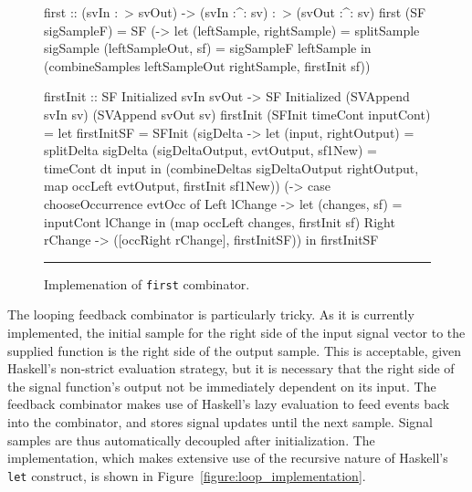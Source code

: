 \begin{figure}
\begin{code}
first :: (svIn :~> svOut) -> (svIn :^: sv) :~> (svOut :^: sv)
first (SF sigSampleF) =
  SF (\sigSample -> let (leftSample, rightSample) = splitSample sigSample
                        (leftSampleOut, sf) = sigSampleF leftSample
                    in (combineSamples leftSampleOut rightSample,
                        firstInit sf))

firstInit ::    SF Initialized svIn svOut
             -> SF Initialized (SVAppend svIn sv) (SVAppend svOut sv)
firstInit (SFInit timeCont inputCont) = 
  let firstInitSF =
    SFInit (\dt sigDelta ->
               let (input, rightOutput) = splitDelta sigDelta
                   (sigDeltaOutput, evtOutput, sf1New) = timeCont dt input
               in (combineDeltas sigDeltaOutput rightOutput,
                   map occLeft evtOutput,
                   firstInit sf1New))
           (\evtOcc ->
              case chooseOccurrence evtOcc of
                Left  lChange -> let (changes, sf) = inputCont lChange
                                 in (map occLeft changes, firstInit sf)
                Right rChange -> ([occRight rChange], firstInitSF))
  in firstInitSF
\end{code}
\hrule
\caption{Implemenation of {\tt first} combinator.}
\label{figure:first_implementation}
\end{figure}

The looping feedback combinator is particularly tricky. As it is currently
implemented, the initial sample for the right side of the input signal vector to
the supplied function is the right side of the output sample. This is acceptable,
given Haskell's non-strict evaluation strategy, but it is necessary that the
right side of the signal function's output not be immediately dependent on its
input. The feedback combinator makes use of Haskell's lazy evaluation to
feed events back into the combinator, and stores signal updates until the next
sample. Signal samples are thus automatically decoupled after initialization.
The implementation, which makes extensive use of the recursive nature of
Haskell's {\tt let} construct, is shown in Figure~\ref{figure:loop_implementation}.

